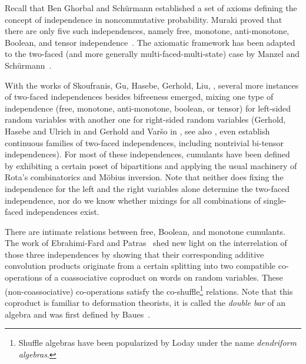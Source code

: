 \documentclass[pdftex]{sigma}
\numberwithin{equation}{section}
\begin{document}
Recall that Ben Ghorbal and Sch\"urmann \cite{BenGhorbalSchurmann} established a set of axioms defining the concept of independence in noncommutative probability. Muraki proved that there are only five such independences, namely free, monotone, anti-monotone, Boolean, and tensor independence~\cite{Muraki2003}. The axiomatic framework has been adapted to the two-faced (and more generally multi-faced-multi-state) case by Manzel and Sch\"urmann~\cite{ManzelSchurmann17}.

With the works of Skoufranis, Gu, Hasebe, Gerhold, Liu,
\cite{gerhold2017preprint,gu2020bi,gu2017bi,gu2019bi,liu2019}, several more
instances of two-faced independences besides bifreeness emerged, mixing one type of independence (free, monotone,
anti-monotone, boolean, or tensor) for left-sided random variables with another
one for right-sided random variables (Gerhold, Hasebe and Ulrich in \cite{GHU21p} and Gerhold and Var\v{s}o in \cite{GerholdVarso2023combinatorial}, see also \cite{Varso-PhD}, even establish continuous families of two-faced independences, including nontrivial bi-tensor independences).
For most of these independences, cumulants have been defined by exhibiting a
certain poset of bipartitions and applying the usual machinery of Rota's combinatorics and M\"obius inversion. Note that
neither does fixing the independence for the left and the right variables alone
determine the two-faced independence, nor do we know whether mixings for all
combinations of single-faced independences exist.

There are intimate relations between free, Boolean, and monotone cumulants.
The work of Ebrahimi-Fard and Patras~\cite{ebrahimi2015cumulants} shed new light on the interrelation of those three independences by showing that their corresponding additive convolution products originate from a certain splitting into two compatible co-operations of a coassociative coproduct on words on random variables. These (non-coassociative) co-operations satisfy the co-shuffle\footnote{Shuffle algebras have been popularized by Loday \cite{loday1763dialgebras} under the name \emph{dendriform algebras}.} relations.
Note that this coproduct is familiar to deformation theorists, it is called the \emph{double bar} of an algebra and was first defined by Baues~\cite{baues1981double}.
\end{document}
